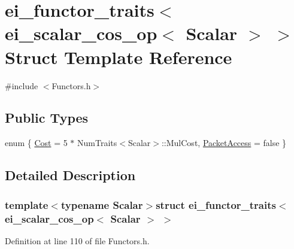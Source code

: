 \hypertarget{structei__functor__traits_3_01ei__scalar__cos__op_3_01_scalar_01_4_01_4}{\section{ei\-\_\-functor\-\_\-traits$<$ ei\-\_\-scalar\-\_\-cos\-\_\-op$<$ Scalar $>$ $>$ Struct Template Reference}
\label{structei__functor__traits_3_01ei__scalar__cos__op_3_01_scalar_01_4_01_4}
}


{\ttfamily \#include $<$Functors.\-h$>$}

\subsection*{Public Types}
\begin{DoxyCompactItemize}
\item 
enum \{ \hyperlink{structei__functor__traits_3_01ei__scalar__cos__op_3_01_scalar_01_4_01_4_ad73d2a82c8ff9c83cedf7ef5400eaa01acb80b2b9c3f370c09c3f6c7cc0ad1daa}{Cost} = 5 $\ast$ Num\-Traits$<$Scalar$>$\-:\-:Mul\-Cost, 
\hyperlink{structei__functor__traits_3_01ei__scalar__cos__op_3_01_scalar_01_4_01_4_ad73d2a82c8ff9c83cedf7ef5400eaa01a8e1d8c25f31c9b0206ae2a5d688a444f}{Packet\-Access} = false
 \}
\end{DoxyCompactItemize}


\subsection{Detailed Description}
\subsubsection*{template$<$typename Scalar$>$struct ei\-\_\-functor\-\_\-traits$<$ ei\-\_\-scalar\-\_\-cos\-\_\-op$<$ Scalar $>$ $>$}



Definition at line 110 of file Functors.\-h.



